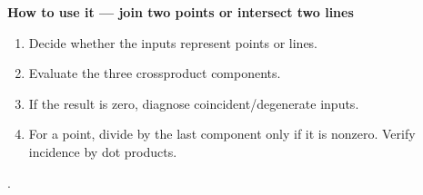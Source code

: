 \documentclass[letterpaper,11pt,english,openany,oneside]{jupyterBook}
\begin{document}
\begin{TextbookBox}
\textbf{How to use it — join two points or intersect two lines}\par\smallskip
\begin{enumerate}
%
\item {}
\sphinxAtStartPar
Decide whether the inputs represent points or lines.

\item {}
\sphinxAtStartPar
Evaluate the three cross\sphinxhyphen{}product components.

\item {}
\sphinxAtStartPar
If the result is zero, diagnose coincident/degenerate inputs.

\item {}
\sphinxAtStartPar
For a point, divide by the last component only if it is nonzero. Verify incidence by dot products.

\end{enumerate}

\sphinxAtStartPar
{} {\hyperref[\detokenize{lectures/lecture01/projective:ex-lec01-intersections}]{}}.

\end{TextbookBox}
\label{\detokenize{lectures/lecture01/projective:ex-lec01-intersections}}
\end{document}
